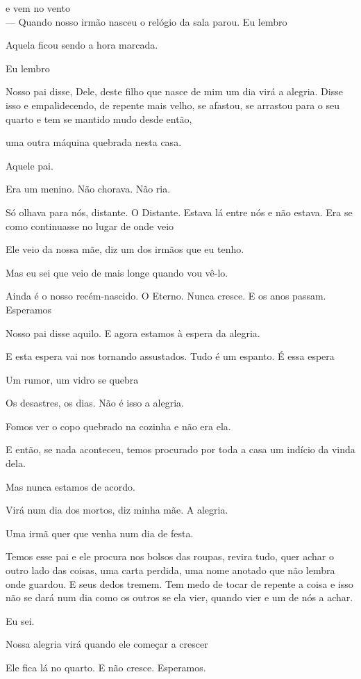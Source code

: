 e vem no vento\\

--- Quando nosso irmão nasceu o relógio da sala parou. Eu lembro

Aquela ficou sendo a hora marcada.

Eu lembro

Nosso pai disse, Dele, deste filho que nasce de mim um dia virá a
alegria. Disse isso e empalidecendo, de repente mais velho, se afastou,
se arrastou para o seu quarto e tem se mantido mudo desde então,

uma outra máquina quebrada nesta casa.

Aquele pai.

Era um menino. Não chorava. Não ria.

Só olhava para nós, distante. O Distante. Estava lá entre nós e não
estava. Era se como continuasse no lugar de onde veio

Ele veio da nossa mãe, diz um dos irmãos que eu tenho.

Mas eu sei que veio de mais longe quando vou vê-lo.

Ainda é o nosso recém-nascido. O Eterno. Nunca cresce. E os anos passam.
Esperamos

Nosso pai disse aquilo. E agora estamos à espera da alegria.

E esta espera vai nos tornando assustados. Tudo é um espanto. É essa
espera

Um rumor, um vidro se quebra

Os desastres, os dias. Não é isso a alegria.

Fomos ver o copo quebrado na cozinha e não era ela.

E então, se nada aconteceu, temos procurado por toda a casa um indício
da vinda dela.

Mas nunca estamos de acordo.

Virá num dia dos mortos, diz minha mãe. A alegria.

Uma irmã quer que venha num dia de festa.

Temos esse pai e ele procura nos bolsos das roupas, revira tudo, quer
achar o outro lado das coisas, uma carta perdida, uma nome anotado que
não lembra onde guardou. E seus dedos tremem. Tem medo de tocar de
repente a coisa e isso não se dará num dia como os outros se ela vier,
quando vier e um de nós a achar.

Eu sei.

Nossa alegria virá quando ele começar a crescer

Ele fica lá no quarto. E não cresce. Esperamos.

